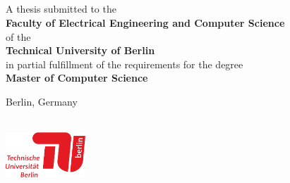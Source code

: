 \thispagestyle{empty}
\rule{0cm}{2cm}

\fontsize{19.83}{26.45} \selectfont 
\noindent \textbf{\titleLineOne} \vspace{0.2cm}
\\\textbf{\titleLineTwo}\vspace{0.2cm}
\\\textbf{\titleLineThree}
\normalsize



\newpage
\thispagestyle{empty}
\rule{0cm}{2cm}
\newpage

\thispagestyle{empty}
\rule{0cm}{1.5cm}

\fontsize{26.44}{32} \selectfont 
\noindent \textbf{\titleLineOne} \vspace{0.2cm}
\\\textbf{\titleLineTwo}\vspace{0.2cm}
\\\textbf{\titleLineThree}
\normalsize



\vspace{1.5cm}
 
\noindent \textbf{\studentname}

\vspace{-0.25cm}
\vspace{7cm}

\noindent A thesis submitted to the 
\\\textbf{Faculty of Electrical Engineering and Computer Science
} 
\\of the 
\\\textbf{Technical University of Berlin} 
\\in partial fulfillment of the requirements for the degree 
\\\textbf{Master of Computer Science}

\vspace{-0.5cm}
 
\noindent Berlin, Germany\\ 
\documentdate\\

\vspace{-0.83cm}

\noindent \includegraphics[width=30mm,angle=0]{graphics/tu_logo}

